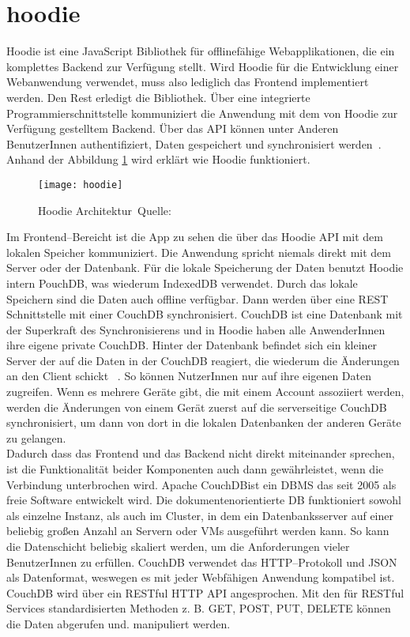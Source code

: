 \section{hoodie}
Hoodie ist eine JavaScript Bibliothek für offlinefähige Webapplikationen, die ein komplettes Backend zur Verfügung stellt. Wird Hoodie für die Entwicklung einer Webanwendung verwendet, muss also lediglich das Frontend implementiert werden. Den Rest erledigt die Bibliothek. Über eine integrierte Programmierschnittstelle kommuniziert die Anwendung mit dem von Hoodie zur Verfügung gestelltem Backend. Über das \gls{API} können unter Anderen BenutzerInnen authentifiziert, Daten gespeichert und synchronisiert werden~\cite{hoodie}.\\
Anhand der Abbildung \ref{fig:hoodie} wird erklärt wie Hoodie funktioniert.
\begin{figure}[H]
  \centering
  \texttt{[image: hoodie]}
  \grayRule
  \caption[Hoodie Architektur]{Hoodie Architektur~Quelle:~\cite{hoodie-how}}
  \label{fig:hoodie}
\end{figure}
Im Frontend--Bereicht ist die App zu sehen die über das Hoodie \gls{API} mit dem lokalen Speicher kommuniziert. Die Anwendung spricht niemals direkt mit dem Server oder der Datenbank. Für die lokale Speicherung der Daten benutzt Hoodie intern PouchDB, was wiederum IndexedDB verwendet. Durch das lokale Speichern sind die Daten auch offline verfügbar. Dann werden über eine \gls{REST} Schnittstelle mit einer CouchDB synchronisiert. CouchDB ist eine Datenbank mit der Superkraft des Synchronisierens und in Hoodie haben alle AnwenderInnen ihre eigene private CouchDB. Hinter der Datenbank befindet sich ein kleiner Server der auf die Daten in der CouchDB reagiert, die wiederum die Änderungen an den Client schickt ~\cite{hoodie-how}.
So können NutzerInnen nur auf ihre eigenen Daten zugreifen. Wenn es mehrere Geräte gibt, die mit einem Account assoziiert werden, werden die Änderungen von einem Gerät zuerst auf die serverseitige CouchDB synchronisiert, um dann von dort in die lokalen Datenbanken der anderen Geräte zu gelangen.\\
Dadurch dass das Frontend und das Backend nicht direkt miteinander sprechen, ist die Funktionalität beider Komponenten auch dann gewährleistet, wenn die Verbindung unterbrochen wird.
%
%
Apache CouchDB\tm ist ein \gls{DBMS} das seit 2005 als freie Software entwickelt wird. Die dokumentenorientierte \gls{DB} funktioniert sowohl als einzelne Instanz, als auch im Cluster, in dem ein Datenbanksserver auf einer beliebig großen Anzahl an Servern oder \glspl{VM} ausgeführt werden kann. So kann die Datenschicht beliebig skaliert werden, um die Anforderungen vieler BenutzerInnen zu erfüllen. CouchDB verwendet das \gls{HTTP}--Protokoll und \gls{JSON} als Datenformat, weswegen es mit jeder Webfähigen Anwendung kompatibel ist. CouchDB wird über ein \gls{REST}ful \gls{HTTP} \gls{API} angesprochen. Mit den für \gls{REST}ful Services standardisierten Methoden z. B. GET, POST, PUT, DELETE können die Daten abgerufen und. manipuliert werden.\\
